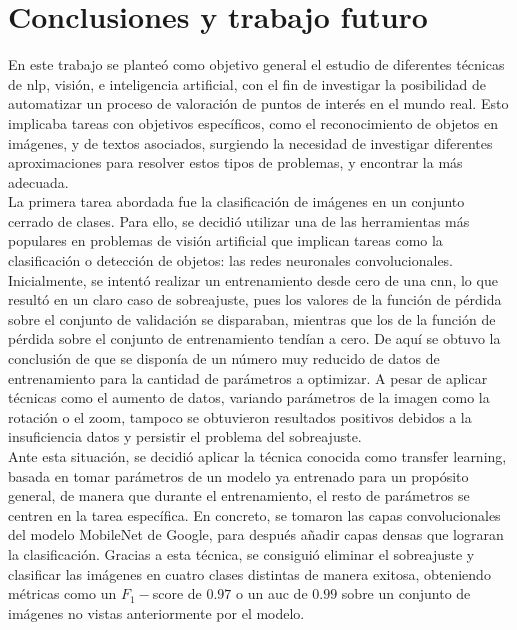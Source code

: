 \chapter{Conclusiones y trabajo futuro}

	En este trabajo se planteó como objetivo general el estudio de diferentes técnicas de \gls{nlp}, visión, e inteligencia artificial, con el fin de investigar la posibilidad de automatizar un proceso de valoración de puntos de interés en el mundo real. Esto implicaba tareas con objetivos específicos, como el reconocimiento de objetos en imágenes, y de textos asociados, surgiendo la necesidad de investigar diferentes aproximaciones para resolver estos tipos de problemas, y encontrar la más adecuada. \\
	
	La primera tarea abordada fue la clasificación de imágenes en un conjunto cerrado de clases. Para ello, se decidió utilizar una de las herramientas más populares en problemas de visión artificial que implican tareas como la clasificación o detección de objetos: las redes neuronales convolucionales. Inicialmente, se intentó realizar un entrenamiento desde cero de una \gls{cnn}, lo que resultó en un claro caso de sobreajuste, pues los valores de la función de pérdida sobre el conjunto de validación se disparaban, mientras que los de la función de pérdida sobre el conjunto de entrenamiento tendían a cero. De aquí se obtuvo la conclusión de que se disponía de un número muy reducido de datos de entrenamiento para la cantidad de parámetros a optimizar. A pesar de aplicar técnicas como el aumento de datos, variando parámetros de la imagen como la rotación o el zoom, tampoco se obtuvieron resultados positivos debidos a la insuficiencia datos y persistir el problema del sobreajuste. \\
	
	Ante esta situación, se decidió aplicar la técnica conocida como transfer learning, basada en tomar parámetros de un modelo ya entrenado para un propósito general, de manera que durante el entrenamiento, el resto de parámetros se centren en la tarea específica. En concreto, se tomaron las capas convolucionales del modelo MobileNet de Google, para después añadir capas densas que lograran la clasificación. Gracias a esta técnica, se consiguió eliminar el sobreajuste y clasificar las imágenes en cuatro clases distintas de manera exitosa, obteniendo métricas como un $F_1-$score de $0.97$ o un \gls{auc} de $0.99$ sobre un conjunto de imágenes no vistas anteriormente por el modelo. \\
	
